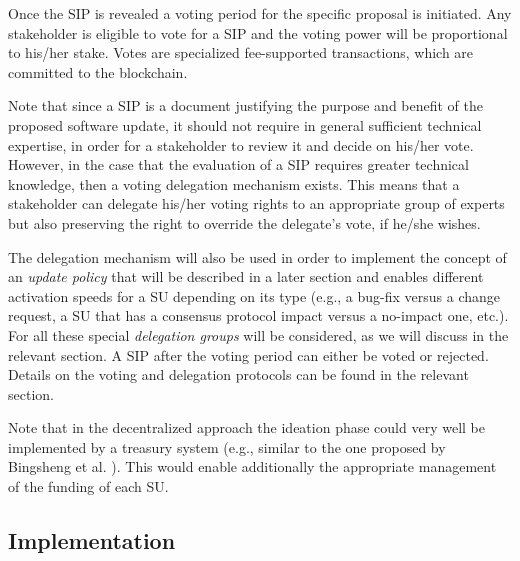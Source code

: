 Once the SIP is revealed a voting period for the specific proposal is initiated. Any stakeholder is eligible to vote for a SIP and the voting power will be proportional to his/her stake. Votes are specialized fee-supported transactions, which are committed to the blockchain.

Note that since a SIP is a document justifying the purpose and benefit of the proposed software update, it should not require in general sufficient technical expertise, in order for a stakeholder to review it and decide on his/her vote. However, in the case that the evaluation of a SIP requires greater technical knowledge, then a voting delegation mechanism exists. This means that a stakeholder can delegate his/her voting rights to an appropriate group of experts but also preserving the right to override the delegate's vote, if he/she wishes. 

The delegation mechanism will also be used in order to implement the concept of an \emph{update policy} that will be described in a later section and enables different activation speeds for a SU depending on its type (e.g., a bug-fix versus a change request, a SU that has a consensus protocol impact versus a no-impact one, etc.). For all these special \emph{delegation groups} will be considered, as we will discuss in the relevant section. A SIP after the voting period can either be voted or rejected. Details on the voting and delegation protocols can be found in the relevant section.

Note that in the decentralized approach the ideation phase could very well be implemented by a treasury system (e.g., similar to the one proposed by Bingsheng et al. \cite{cryptoeprint:2018:435}). This would enable additionally the appropriate management of the funding of each SU.

\subsection{Implementation}
%

